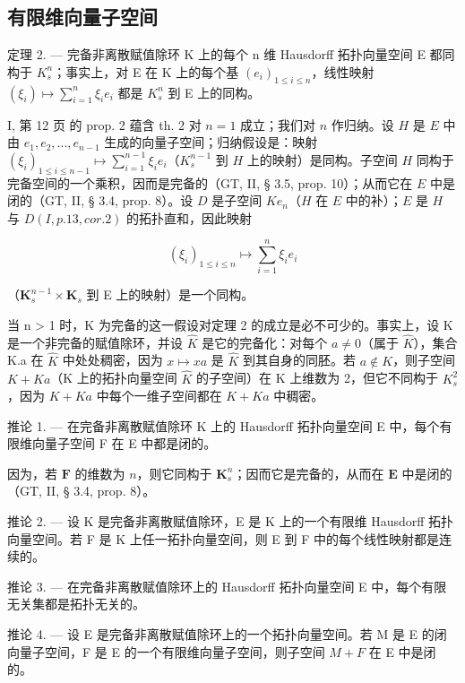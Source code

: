 \subsection{有限维向量子空间}

定理 2. --- 完备非离散赋值除环 K 上的每个 n 维 Hausdorff 拓扑向量空间 E 都同构于 \(K_{s}^{n}\)；事实上，对 E 在 K 上的每个基 \((e_{i})_{1\leqslant i\leqslant n}\)，线性映射 \((\xi_{i})\mapsto\sum_{i=1}^{n}\xi_{i}e_{i}\) 都是 \(K_{s}^{n}\) 到 E 上的同构。

I, 第 12 页 的 prop. 2 蕴含 th. 2 对 \(n = 1\) 成立；我们对 \(n\) 作归纳。设 \(H\) 是 \(E\) 中由 \(e_1, e_2, ..., e_{n-1}\) 生成的向量子空间；归纳假设是：映射 \((\xi_i)_{1 \leqslant i \leqslant n-1} \mapsto \sum_{i=1}^{n-1} \xi_i e_i\)（\(K_s^{n-1}\) 到 \(H\) 上的映射）是同构。子空间 \(H\) 同构于完备空间的一个乘积，因而是完备的（GT, II, § 3.5, prop. 10）；从而它在 \(E\) 中是闭的（GT, II, § 3.4, prop. 8）。设 \(D\) 是子空间 \(K e_n\)（\(H\) 在 \(E\) 中的补）；\(E\) 是 \(H\) 与 \(D(I, p. 13, cor. 2)\) 的拓扑直和，因此映射

\[
\left(\xi_ {i}\right) _ {1 \leqslant i \leqslant n} \mapsto \sum_ {i = 1} ^ {n} \xi_ {i} e _ {i}
\]

（\(\mathbf{K}_s^{n - 1}\times \mathbf{K}_s\) 到 E 上的映射）是一个同构。

当 n \textgreater{} 1 时，K 为完备的这一假设对定理 2 的成立是必不可少的。事实上，设 K 是一个非完备的赋值除环，并设 \(\hat{K}\) 是它的完备化：对每个 \(a \neq 0\)（属于 \(\hat{K}\)），集合 K.a 在 \(\hat{K}\) 中处处稠密，因为 \(x \mapsto xa\) 是 \(\hat{K}\) 到其自身的同胚。若 \(a \notin K\)，则子空间 \(K + Ka\)（K 上的拓扑向量空间 \(\hat{K}\) 的子空间）在 K 上维数为 2，但它不同构于 \(K_{s}^{2}\)，因为 \(K + Ka\) 中每个一维子空间都在 \(K + Ka\) 中稠密。

推论 1. --- 在完备非离散赋值除环 K 上的 Hausdorff 拓扑向量空间 E 中，每个有限维向量子空间 F 在 E 中都是闭的。

因为，若 \(\mathbf{F}\) 的维数为 \(n\)，则它同构于 \(\mathbf{K}_s^n\)；因而它是完备的，从而在 \(\mathbf{E}\) 中是闭的（GT, II, § 3.4, prop. 8）。

推论 2. --- 设 K 是完备非离散赋值除环，E 是 K 上的一个有限维 Hausdorff 拓扑向量空间。若 F 是 K 上任一拓扑向量空间，则 E 到 F 中的每个线性映射都是连续的。

推论 3. --- 在完备非离散赋值除环上的 Hausdorff 拓扑向量空间 E 中，每个有限无关集都是拓扑无关的。

推论 4. --- 设 E 是完备非离散赋值除环上的一个拓扑向量空间。若 M 是 E 的闭向量子空间，F 是 E 的一个有限维向量子空间，则子空间 \(M + F\) 在 E 中是闭的。

